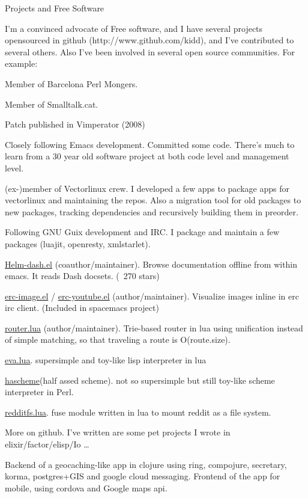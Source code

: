 \documentclass{resume} %
\begin{document}
\begin{rSection}{Projects and Free Software}

  I'm a convinced advocate of Free software, and I have several
  projects opensourced in github (http://www.github.com/kidd), and
  I've contributed to several others. Also I've been involved in
  several open source communities. For example:

\item Member of Barcelona Perl Mongers.
\item Member of Smalltalk.cat.
\item Patch published in Vimperator (2008)
\item Closely following Emacs development. Committed some code. There's
  much to learn from a 30 year old software project at both code level
  and management level.
\item (ex-)member of Vectorlinux crew. I developed a few apps to
  package apps for vectorlinux and maintaining the repos. Also a
  migration tool for old packages to new packages, tracking
  dependencies and recursively building them in preorder.
\item Following GNU Guix development and IRC.  I package and maintain
  a few packages (luajit, openresty, xmlstarlet).
\item \href{https://github.com/areina/helm-dash}{Helm-dash.el}
  (coauthor/maintainer). Browse documentation offline from within
  emacs. It reads Dash docsets. (~270 stars)
\item
  \href{https://github.com/kidd/erc-image.el}{erc-image.el} /
  \href{https://github.com/kidd/erc-youtube.el}{erc-youtube.el}
  (author/maintainer). Visualize images inline in erc irc
  client. (Included in spacemacs project)
\item \href{https://github.com/apitools/router.lua}{router.lua}
  (author/maintainer). Trie-based router in lua using unification
  instead of simple matching, so that traveling a route is
  O(route.size).
\item \href{https://github.com/kidd/eva}{eva.lua}. supersimple and
  toy-like lisp interpreter in lua
\item \href{https://github.com/kidd/hascheme}{hascheme}(half assed
  scheme). not so supersimple but still toy-like scheme interpreter in
  Perl.
\item \href{https://github.com/kidd/redditfs.lua}{redditfs.lua}. fuse
  module written in lua to mount reddit as a file system.
\item More on github. I've written are some pet projects I wrote in
  elixir/factor/elisp/Io \ldots
\item Backend of a geocaching-like app in clojure using ring,
  compojure, secretary, korma, postgres+GIS and google cloud
  messaging. Frontend of the app for mobile, using cordova and Google
  maps api.

\end{rSection}
\end{document}
